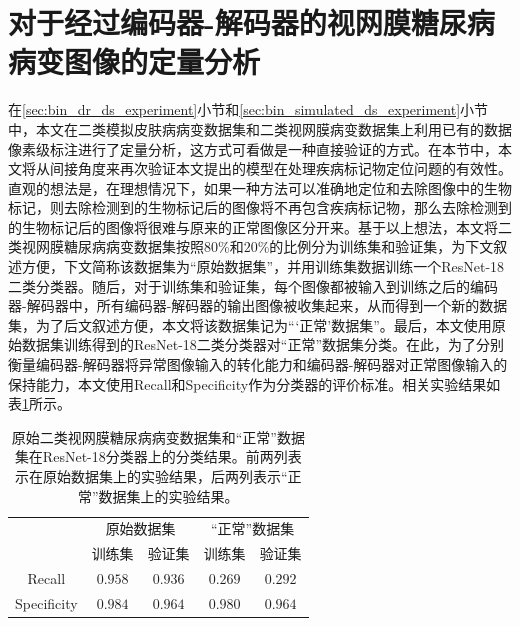 \section{对于经过编码器-解码器的视网膜糖尿病病变图像的定量分析}\label{sec:indirect_quantitative_evaluation}
在\ref{sec:bin_dr_ds_experiment}小节和\ref{sec:bin_simulated_ds_experiment}小节中，本文在二类模拟皮肤病病变数据集和二类视网膜病变数据集上利用已有的数据像素级标注进行了定量分析，这方式可看做是一种直接验证的方式。在本节中，本文将从间接角度来再次验证本文提出的模型在处理疾病标记物定位问题的有效性。直观的想法是，在理想情况下，如果一种方法可以准确地定位和去除图像中的生物标记，则去除检测到的生物标记后的图像将不再包含疾病标记物，那么去除检测到的生物标记后的图像将很难与原来的正常图像区分开来。基于以上想法，本文将二类视网膜糖尿病病变数据集按照$80$\%和$20$\%的比例分为训练集和验证集，为下文叙述方便，下文简称该数据集为“原始数据集”，并用训练集数据训练一个ResNet-18二类分类器。随后，对于训练集和验证集，每个图像都被输入到训练之后的编码器-解码器中，所有编码器-解码器的输出图像被收集起来，从而得到一个新的数据集，为了后文叙述方便，本文将该数据集记为“‘正常’数据集”。最后，本文使用原始数据集训练得到的ResNet-18二类分类器对“正常”数据集分类。在此，为了分别衡量编码器-解码器将异常图像输入的转化能力和编码器-解码器对正常图像输入的保持能力，本文使用Recall和Specificity作为分类器的评价标准。相关实验结果如表\ref{tab:quantitative_retinal}所示。

\begin{table}[h!]
	\begin{center}
		\caption{原始二类视网膜糖尿病病变数据集和“正常”数据集在ResNet-18分类器上的分类结果。前两列表示在原始数据集上的实验结果，后两列表示“正常”数据集上的实验结果。} 
		\label{tab:quantitative_retinal}
		\begin{tabular}{c|cc|cc}
			\toprule[2pt]
			& \multicolumn{2}{c|}{原始数据集} & \multicolumn{2}{c}{“正常”数据集} \\
			&  训练集 & 验证集 & 训练集 & 验证集\\
			\midrule[2pt]
			Recall & $0.958$ & $0.936$ & $0.269$ & $0.292$\\ \hline
			Specificity & $0.984$ & $0.964$ & $0.980$ & $0.964$\\
			\bottomrule[2pt]
		\end{tabular} 
	\end{center}
\end{table}

